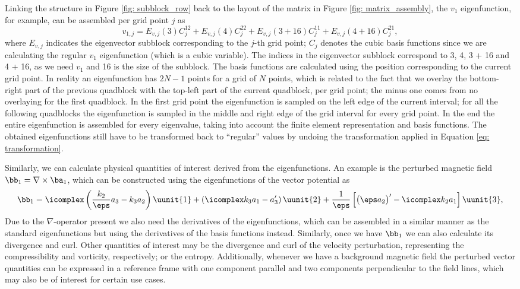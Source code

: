 Linking the structure in Figure \ref{fig: subblock_row} back to the layout of the matrix in Figure \ref{fig: matrix_assembly}, the $v_1$ eigenfunction, for example, can be assembled per grid point $j$ as
\begin{equation}
  v_{1, j} = E_{v, j}(3)C_j^{12} + E_{v, j}(4)C_j^{22} + E_{v, j}(3 + 16)C_j^{11} + E_{v, j}(4 + 16)C_j^{21},
\end{equation}
where $E_{v, j}$ indicates the eigenvector subblock corresponding to the $j$-th grid point; $C_j$ denotes the cubic basis functions since we are calculating the regular $v_1$ eigenfunction (which is a cubic variable). The indices in the eigenvector subblock correspond to 3, 4, 3 + 16 and 4 + 16, as we need $v_1$ and 16 is the size of the subblock. The basis functions are calculated using the position corresponding to the current grid point. In reality an eigenfunction has $2N - 1$ points for a grid of $N$ points, which is related to the fact that we overlay the bottom-right part of the previous quadblock with the top-left part of the current quadblock, per grid point; the minus one comes from no overlaying for the first quadblock. In the first grid point the eigenfunction is sampled on the left edge of the current interval; for all the following quadblocks the eigenfunction is sampled in the middle and right edge of the grid interval for every grid point. In the end the entire eigenfunction is assembled for every eigenvalue, taking into account the finite element representation and basis functions. The obtained eigenfunctions still have to be transformed back to ``regular'' values by undoing the transformation applied in Equation \eqref{eq: transformation}.

Similarly, we can calculate physical quantities of interest derived from the eigenfunctions. An example is the perturbed magnetic field $\bb_1 = \nabla \times \ba_1$, which can be constructed using the eigenfunctions of the vector potential as
\begin{equation}
  \bb_1 =
    \icomplex \left(\frac{k_2}{\eps}a_3 - k_3 a_2\right)\uunit{1}
    + \left(\icomplex k_3 a_1 - a_3'\right)\uunit{2}
    + \frac{1}{\eps}\left[\bigl(\eps a_2\bigr)' - \icomplex k_2 a_1 \right]\uunit{3},
\end{equation}
Due to the $\nabla$-operator present we also need the derivatives of the eigenfunctions, which can be assembled in a similar manner as the standard eigenfunctions but using the derivatives of the basis functions instead. Similarly, once we have $\bb_1$ we can also calculate its divergence and curl. Other quantities of interest may be the divergence and curl of the velocity perturbation, representing the compressibility and vorticity, respectively; or the entropy. Additionally, whenever we have a background magnetic field the perturbed vector quantities can be expressed in a reference frame with one component parallel and two components perpendicular to the field lines, which may also be of interest for certain use cases.

\cleardoublepage
